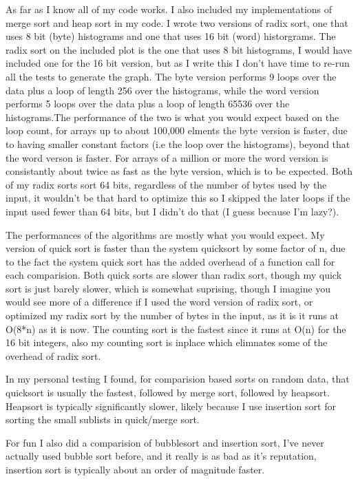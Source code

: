 \documentclass[11pt]{article}
\author{Tucker DiNapoli}
\date{\today}
\title{}
\begin{document}
\tableofcontents

As far as I know all of my code works. I also included my implementations of
merge sort and heap sort in my code. I wrote two versions of radix sort, one
that uses 8 bit (byte) histograms and one that uses 16 bit (word)
historgrams. The radix sort on the included plot is the one that uses 8 bit
histograms, I would have included one for the 16 bit version, but as I write
this I don't have time to re-run all the tests to generate the graph. The byte
version performs 9 loops over the data plus a loop of length 256 over the
histograms, while the word version performs 5 loops over the data plus a loop
of length 65536 over the histograms.The performance of the two is what you
would expect based on the loop count, for arrays up to about 100,000 elments
the byte version is faster, due to having smaller constant factors (i.e the
loop over the histograms), beyond that the word verson is faster. For arrays of
a million or more the word version is consistantly about twice as fast as the
byte version, which is to be expected. Both of my radix sorts sort 64 bits,
regardless of the number of bytes used by the input, it wouldn't be that hard
to optimize this so I skipped the later loops if the input used fewer than 64
bits, but I didn't do that (I guess because I'm lazy?).


The performances of the algorithms are mostly what you would expect. My version
of quick sort is faster than the system quicksort by some factor of n, due to
the fact the system quick sort has the added overhead of a function call for
each comparision. Both quick sorts are slower than radix sort, though my
quick sort is just barely slower, which is somewhat suprising, though I imagine
you would see more of a difference if I used the word version of radix sort, or
optimized my radix sort by the number of bytes in the input, as it is it runs
at O(8*n) as it is now. The counting sort is the fastest since it runs at O(n)
for the 16 bit integers, also my counting sort is inplace which elimnates some
of the overhead of radix sort.

In my personal testing I found, for comparision based sorts on random data,
that quicksort is usually the fastest, followed by merge sort, followed by
heapsort. Heapsort is typically significantly slower, likely because I use
insertion sort for sorting the small sublists in quick/merge sort.

For fun I also did a comparision of bubblesort and insertion sort, I've never
actually used bubble sort before, and it really is as bad as it's reputation,
insertion sort is typically about an order of magnitude faster.
\end{document}
